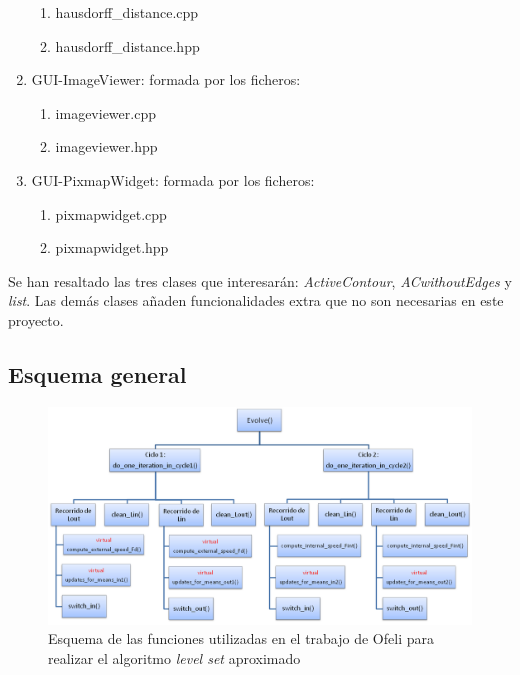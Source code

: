 \begin{enumerate}
	\begin{enumerate}
		\item hausdorff\_distance.cpp
		\item hausdorff\_distance.hpp
	\end{enumerate}
	\item GUI-ImageViewer: formada por los ficheros:
	\begin{enumerate}
		\item imageviewer.cpp
		\item imageviewer.hpp
	\end{enumerate}
	\item GUI-PixmapWidget: formada por los ficheros:
	\begin{enumerate}
		\item pixmapwidget.cpp
		\item pixmapwidget.hpp
	\end{enumerate}
\end{enumerate}
 
Se han resaltado las tres clases que interesar\'{a}n: \textit{ActiveContour}, \textit{ACwithoutEdges} y \textit{list}. Las dem\'{a}s clases a\~{n}aden funcionalidades extra que no son necesarias en este proyecto.
 
\subsection{Esquema general}

 \begin{figure}[H]
 	\captionsetup{justification=centering}
 	\centering
 	\includegraphics[width=1.3\textwidth]{./imagenes/esquemaOfeli}
 	\caption{Esquema de las funciones utilizadas en el trabajo de Ofeli para realizar el algoritmo \textit{level set }aproximado}	
 	\label{esquemaOfeli}
 \end{figure}

